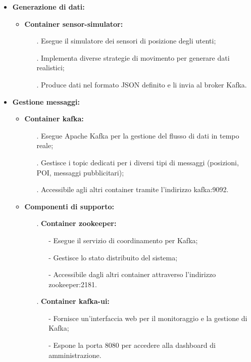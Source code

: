 \documentclass[10pt]{article}
\begin{document}
\begin{itemize}
    \item \textbf{Generazione di dati:}
    \begin{itemize}
        \item \textbf{Container sensor-simulator:}
        \begin{itemize}
            \item[.] Esegue il simulatore dei sensori di posizione degli utenti;
            \item[.] Implementa diverse strategie di movimento per generare dati realistici;
            \item[.] Produce dati nel formato JSON definito e li invia al broker Kafka.
        \end{itemize}
    \end{itemize}
    
    \item \textbf{Gestione messaggi:}
    \begin{itemize}
        \item \textbf{Container kafka:}
        \begin{itemize}
            \item[.] Esegue Apache Kafka per la gestione del flusso di dati in tempo reale;
            \item[.] Gestisce i topic dedicati per i diversi tipi di messaggi (posizioni, POI, messaggi pubblicitari);
            \item[.] Accessibile agli altri container tramite l'indirizzo kafka:9092.
        \end{itemize}
        \item \textbf{Componenti di supporto:}
        \begin{itemize}
            \item[.] \textbf{Container zookeeper:}
            \begin{itemize}
                \item[-] Esegue il servizio di coordinamento per Kafka;
                \item[-] Gestisce lo stato distribuito del sistema;
                \item[-] Accessibile dagli altri container attraverso l'indirizzo zookeeper:2181.
            \end{itemize}
            \item[.] \textbf{Container kafka-ui:}
            \begin{itemize}
                \item[-] Fornisce un'interfaccia web per il monitoraggio e la gestione di Kafka;
                \item[-] Espone la porta 8080 per accedere alla dashboard di amministrazione.
            \end{itemize}
        \end{itemize}
    \end{itemize}
    

\end{itemize}
\end{document}
